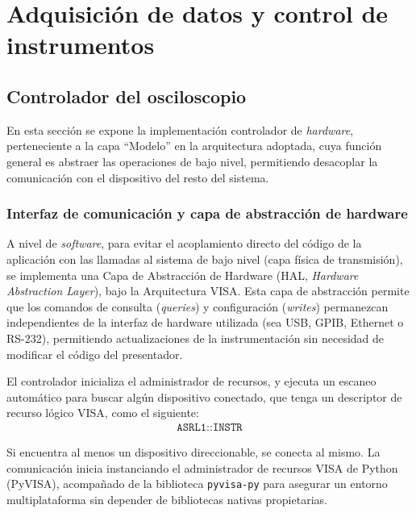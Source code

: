 \newpage
\chapter{Adquisición de datos y control de instrumentos}
\vspace{3\baselineskip}

\section{Controlador del osciloscopio}
\label{sec:controlador_osciloscopio}

En esta sección se expone la implementación controlador de \emph{hardware}, perteneciente a la capa \enquote{Modelo} en la arquitectura adoptada, cuya función general es abstraer las operaciones de bajo nivel, permitiendo desacoplar la comunicación con el dispositivo del resto del sistema.

\subsection{Interfaz de comunicación y capa de abstracción de hardware}
\label{subsec:interfaz_fisica_hal}

A nivel de \emph{software}, para evitar el acoplamiento directo del código de la aplicación con las llamadas al sistema de bajo nivel (capa física de transmisión), se implementa una Capa de Abstracción de Hardware (HAL, \emph{Hardware Abstraction Layer}), bajo la Arquitectura VISA. Esta capa de abstracción permite que los comandos de consulta (\textit{queries}) y configuración (\textit{writes}) permanezcan independientes de la interfaz de hardware utilizada (sea USB, GPIB, Ethernet o RS-232), permitiendo actualizaciones de la instrumentación sin necesidad de modificar el código del presentador.

El controlador inicializa el administrador de recursos, y ejecuta un escaneo automático para buscar algún dispositivo conectado, que tenga un descriptor de recurso lógico VISA, como el siguiente:
\begin{align*}
    \texttt{ASRL1::INSTR}
\end{align*}

Si encuentra al menos un dispositivo direccionable, se conecta al mismo. La comunicación inicia instanciando el administrador de recursos VISA de Python (PyVISA), acompañado de la biblioteca \texttt{pyvisa-py} para asegurar un entorno multiplataforma sin depender de bibliotecas nativas propietarias.

